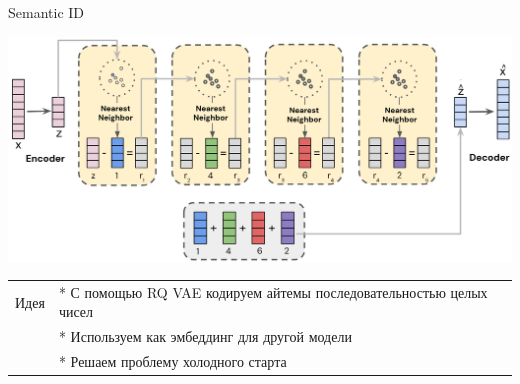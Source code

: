 \documentclass[11pt,aspectratio=169,handout]{beamer}
\begin{document}
\begin{frame}{Semantic ID \cite{singh2024better}}

\begin{center}
\includegraphics[scale=0.1]{images/rqvae_sid_spm.png}
\end{center}

\vfill
\begin{small}
\begin{tabular}{l l}
Идея & * С помощью RQ VAE кодируем айтемы последовательностью целых чисел \\
& * Используем как эмбеддинг для другой модели \\
& * Решаем проблему холодного старта
\end{tabular}
\end{small}

\end{frame}
\end{document}
